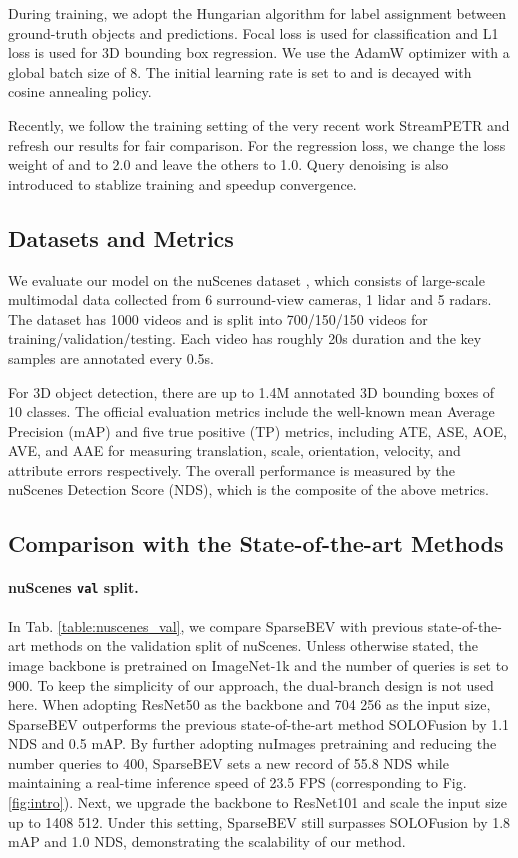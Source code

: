 \documentclass[10pt,twocolumn,letterpaper]{article}
\begin{document}
During training, we adopt the Hungarian algorithm \cite{hungarian} for label assignment between ground-truth objects and predictions. Focal loss \cite{focalloss} is used for classification and L1 loss is used for 3D bounding box regression. We use the AdamW \cite{adamw} optimizer with a global batch size of 8. The initial learning rate is set to  and is decayed with cosine annealing policy.

Recently, we follow the training setting of the very recent work StreamPETR \cite{streampetr} and refresh our results for fair comparison. For the regression loss, we change the loss weight of  and  to 2.0 and leave the others to 1.0. Query denoising \cite{dndetr} is also introduced to stablize training and speedup convergence.

\subsection{Datasets and Metrics}

We evaluate our model on the nuScenes dataset \cite{nuscenes}, which consists of large-scale multimodal data collected from 6 surround-view cameras, 1 lidar and 5 radars. The dataset has 1000 videos and is split into 700/150/150 videos for training/validation/testing. Each video has roughly 20s duration and the key samples are annotated every 0.5s.

For 3D object detection, there are up to 1.4M annotated 3D bounding boxes of 10 classes. The official evaluation metrics include the well-known mean Average Precision (mAP) and five true positive (TP) metrics, including ATE, ASE, AOE, AVE, and AAE for measuring translation, scale, orientation, velocity, and attribute errors respectively. The overall performance is measured by the nuScenes Detection Score (NDS), which is the composite of the above metrics.

\subsection{Comparison with the State-of-the-art Methods}

\paragraph{nuScenes \texttt{val} split.} In Tab. \ref{table:nuscenes_val}, we compare SparseBEV with previous state-of-the-art methods on the validation split of nuScenes.
Unless otherwise stated, the image backbone is pretrained on ImageNet-1k \cite{imagenet} and the number of queries is set to 900.
To keep the simplicity of our approach, the dual-branch design is not used here.
When adopting ResNet50 as the backbone and 704  256 as the input size, SparseBEV outperforms the previous state-of-the-art method SOLOFusion by 1.1 NDS and 0.5 mAP.
By further adopting nuImages \cite{nuscenes} pretraining and reducing the number queries to 400, SparseBEV sets a new record of 55.8 NDS while maintaining a real-time inference speed of 23.5 FPS (corresponding to Fig. \ref{fig:intro}).
Next, we upgrade the backbone to ResNet101 and scale the input size up to 1408  512.
Under this setting, SparseBEV still surpasses SOLOFusion by 1.8 mAP and 1.0 NDS, demonstrating the scalability of our method.
\end{document}
